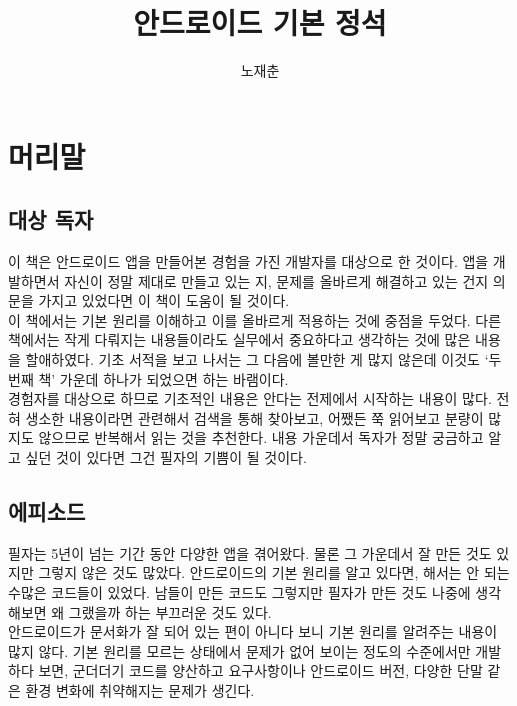 \documentclass[a4paper,hidelinks,10pt,openany]{book} %
\title{안드로이드 기본 정석}
\author{노재춘}
\begin{document}

\maketitle
\chapter*{머리말}
\section{대상 독자}
이 책은 안드로이드 앱을 만들어본 경험을 가진 개발자를 대상으로 한 것이다. 
앱을 개발하면서 자신이 정말 제대로 만들고 있는 지, 문제를 올바르게 해결하고 있는 건지 의문을 가지고 있었다면 이 책이 도움이 될 것이다.\\

이 책에서는 기본 원리를 이해하고 이를 올바르게 적용하는 것에 중점을 두었다. 
다른 책에서는 작게 다뤄지는 내용들이라도 실무에서 중요하다고 생각하는 것에 많은 내용을 할애하였다.
기초 서적을 보고 나서는 그 다음에 볼만한 게 많지 않은데 이것도 `두 번째 책' 가운데 하나가 되었으면 하는 바램이다.\\

경험자를 대상으로 하므로 기초적인 내용은 안다는 전제에서 시작하는 내용이 많다. 
전혀 생소한 내용이라면 관련해서 검색을 통해 찾아보고, 어쨌든 쭉 읽어보고 분량이 많지도 않으므로 반복해서 읽는 것을 추천한다. 
내용 가운데서 독자가 정말 궁금하고 알고 싶던 것이 있다면 그건 필자의 기쁨이 될 것이다.

\section{에피소드}
필자는 5년이 넘는 기간 동안 다양한 앱을 겪어왔다. 물론 그 가운데서 잘 만든 것도 있지만 그렇지 않은 것도 많았다. 
안드로이드의 기본 원리를 알고 있다면, 해서는 안 되는 수많은 코드들이 있었다.
남들이 만든 코드도 그렇지만 필자가 만든 것도 나중에 생각해보면 왜 그랬을까 하는 부끄러운 것도 있다.\\

안드로이드가 문서화가 잘 되어 있는 편이 아니다 보니 기본 원리를 알려주는 내용이 많지 않다. 
기본 원리를 모르는 상태에서 문제가 없어 보이는 정도의 수준에서만 개발하다 보면, 군더더기 코드를 양산하고 요구사항이나 안드로이드 버전, 다양한 단말 같은 환경 변화에 취약해지는 문제가 생긴다.\\
\end{document}
